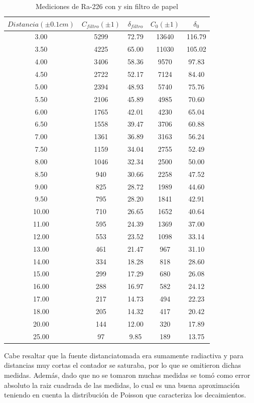 \documentclass[%
 reprint,
 amsmath,amssymb,
 aps,
]{revtex4-1}
\begin{document}
\begin{table}[h!]
\centering
 \begin{tabular}{|c|c|c|c|c|} 
 \hline
 $Distancia(\pm0.1cm)$& $C_{filtro}(\pm1)$& $\delta_{filtro}$ & $C_{0}(\pm1)$ & $\delta_0$ \\ [0.5ex] 
 \hline\hline
 3.00&5299&72.79&13640&116.79\\
 3.50&4225&65.00&11030&105.02\\
 4.00&3406&58.36&9570&97.83\\
 4.50&2722&52.17&7124&84.40\\
 5.00&2394&48.93&5740&75.76\\
 5.50&2106&45.89&4985&70.60\\
 6.00&1765&42.01&4230&65.04\\
 6.50&1558&39.47&3706&60.88\\
 7.00&1361&36.89&3163&56.24\\
 7.50&1159&34.04&2755&52.49\\
 8.00&1046&32.34&2500&50.00\\
 8.50&940&30.66&2258&47.52\\
 9.00&825&28.72&1989&44.60\\
 9.50&795&28.20&1841&42.91\\
 10.00&710&26.65&1652&40.64\\
 11.00&595&24.39&1369&37.00\\
 12.00&553&23.52&1098&33.14\\
 13.00&461&21.47&967&31.10\\
 14.00&334&18.28&818&28.60\\
 15.00&299&17.29&680&26.08\\
 16.00&288&16.97&582&24.12\\
 17.00&217&14.73&494&22.23\\
 18.00&205&14.32&417&20.42\\
 20.00&144&12.00&320&17.89\\
 25.00&97&9.85&189&13.75\\
 [1ex] 
 \hline
 \end{tabular}
 \caption{Mediciones de Ra-226 con y sin filtro de papel}
 \label{table:alcance}
\end{table}

Cabe resaltar que la fuente distanciatomada era sumamente radiactiva y para distancias muy cortas el contador se saturaba, por lo que se omitieron dichas medidas. Además, dado que no se tomaron muchas medidas se tomó como error absoluto la raiz cuadrada de las medidas, lo cual es una buena aproximación teniendo en cuenta la distribución de Poisson que caracteriza los decaimientos.\\
\end{document}
